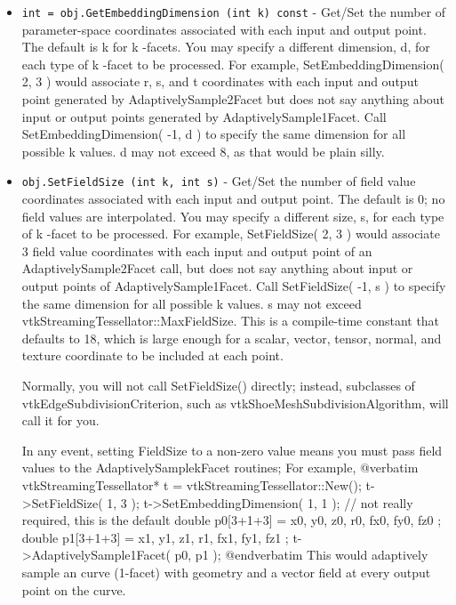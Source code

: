 \begin{itemize}
\item  \verb|int = obj.GetEmbeddingDimension (int k) const| -  Get/Set the number of parameter-space coordinates associated with each input and output point.
 The default is  k for  k -facets. You may
 specify a different dimension,  d, for each type of  k -facet to be processed.
 For example,  SetEmbeddingDimension(  2,  3 ) would associate  r,  s, and
  t coordinates with each input and output point generated by  AdaptivelySample2Facet
 but does not say anything about input or output points generated by
  AdaptivelySample1Facet. 
 Call  SetEmbeddingDimension(  -1,  d ) to specify the same dimension for
 all possible  k values.
  d may not exceed 8, as that would be plain silly.

\item  \verb|obj.SetFieldSize (int k, int s)| -  Get/Set the number of field value coordinates associated with each input and output point.
 The default is 0; no field values are interpolated.
 You may specify a different size,  s, for each type of  k -facet to be processed.
 For example,  SetFieldSize(  2,  3 ) would associate 3 field value coordinates
 with each input and output point of an  AdaptivelySample2Facet call,
 but does not say anything about input or output points of  AdaptivelySample1Facet. 
 Call  SetFieldSize(  -1,  s ) to specify the same dimension for all possible  k values.
  s may not exceed vtkStreamingTessellator::MaxFieldSize.
 This is a compile-time constant that defaults to 18, which is large enough for
 a scalar, vector, tensor, normal, and texture coordinate to be included at each point.

 Normally, you will not call  SetFieldSize() directly; instead, subclasses of
 vtkEdgeSubdivisionCriterion, such as vtkShoeMeshSubdivisionAlgorithm, will call it
 for you.

 In any event, setting  FieldSize to a non-zero value means you must pass field
 values to the  AdaptivelySamplekFacet routines; For example,
 @verbatim
    vtkStreamingTessellator* t = vtkStreamingTessellator::New();
    t->SetFieldSize( 1, 3 );
    t->SetEmbeddingDimension( 1, 1 ); // not really required, this is the default
    double p0[3+1+3] = { x0, y0, z0, r0, fx0, fy0, fz0 };
    double p1[3+1+3] = { x1, y1, z1, r1, fx1, fy1, fz1 };
    t->AdaptivelySample1Facet( p0, p1 );
 @endverbatim
 This would adaptively sample an curve (1-facet) with geometry and
 a vector field at every output point on the curve.


\end{itemize}
